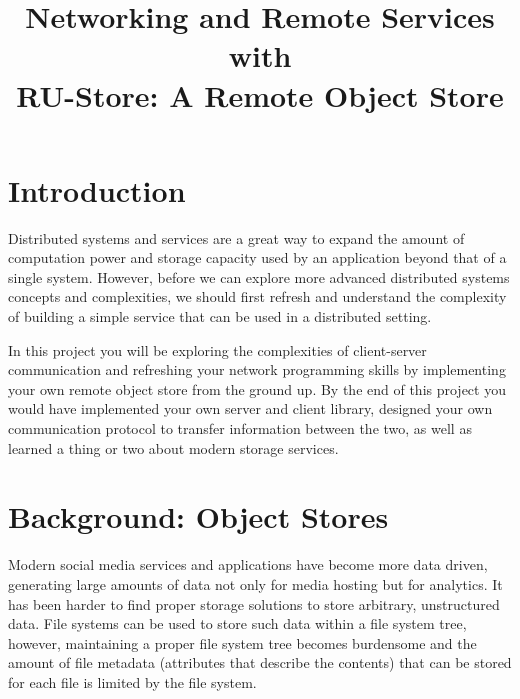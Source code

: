 \documentclass{article}
\title{Networking and Remote Services with\\ RU-Store: A Remote Object Store} %
\date{}%
\begin{document}
\maketitle %


\vspace{-1.5cm}

\section*{Introduction} %
Distributed systems and services are a great way to expand the amount of computation power and storage capacity used by an application beyond that of a single system. However, before we can explore more advanced distributed systems concepts and complexities, we should first refresh and understand the complexity of building a simple service that can be used in a distributed setting.

In this project you will be exploring the complexities of client-server communication and refreshing your network programming skills by implementing your own remote object store from the ground up. By the end of this project you would have implemented your own server and client library, designed your own communication protocol to transfer information between the two, as well as learned a thing or two about modern storage services.



\section{Background: Object Stores} %
Modern social media services and applications have become more data driven, generating large amounts of data not only for media hosting but for analytics. It has been harder to find proper storage solutions to store arbitrary, unstructured data. File systems can be used to store such data within a file system tree, however, maintaining a proper file system tree becomes burdensome and the amount of file metadata (attributes that describe the contents) that can be stored for each file is limited by the file system.
 
\end{document}
